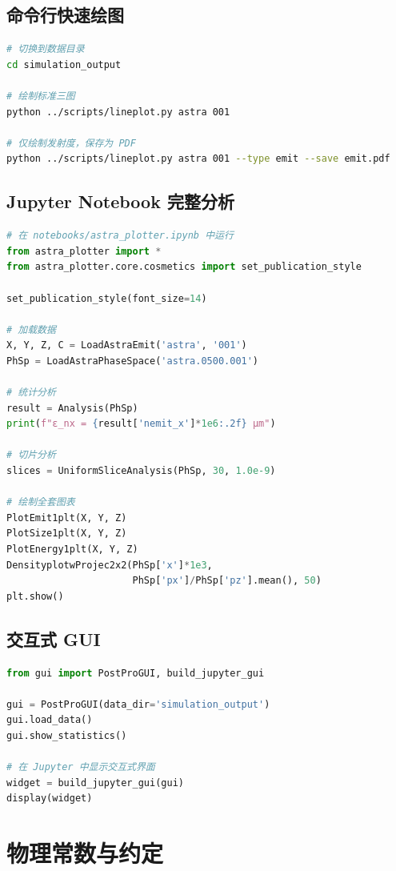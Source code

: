 \documentclass[11pt,a4paper]{article}
\begin{document}
\subsection{命令行快速绘图}
\begin{lstlisting}[language=bash]
# 切换到数据目录
cd simulation_output

# 绘制标准三图
python ../scripts/lineplot.py astra 001

# 仅绘制发射度，保存为 PDF
python ../scripts/lineplot.py astra 001 --type emit --save emit.pdf
\end{lstlisting}

\subsection{Jupyter Notebook 完整分析}
\begin{lstlisting}[language=python]
# 在 notebooks/astra_plotter.ipynb 中运行
from astra_plotter import *
from astra_plotter.core.cosmetics import set_publication_style

set_publication_style(font_size=14)

# 加载数据
X, Y, Z, C = LoadAstraEmit('astra', '001')
PhSp = LoadAstraPhaseSpace('astra.0500.001')

# 统计分析
result = Analysis(PhSp)
print(f"ε_nx = {result['nemit_x']*1e6:.2f} µm")

# 切片分析
slices = UniformSliceAnalysis(PhSp, 30, 1.0e-9)

# 绘制全套图表
PlotEmit1plt(X, Y, Z)
PlotSize1plt(X, Y, Z)
PlotEnergy1plt(X, Y, Z)
DensityplotwProjec2x2(PhSp['x']*1e3,
                      PhSp['px']/PhSp['pz'].mean(), 50)
plt.show()
\end{lstlisting}

\subsection{交互式 GUI}
\begin{lstlisting}[language=python]
from gui import PostProGUI, build_jupyter_gui

gui = PostProGUI(data_dir='simulation_output')
gui.load_data()
gui.show_statistics()

# 在 Jupyter 中显示交互式界面
widget = build_jupyter_gui(gui)
display(widget)
\end{lstlisting}

\section{物理常数与约定}
\end{document}
